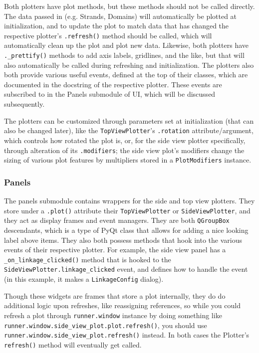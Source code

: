 \documentclass[titlepage]{article}
\begin{document}
	Both plotters have plot methods, but these methods should not be called directly. The data passed in (e.g. Strands, Domains) will automatically be plotted at initialization, and to update the plot to match data that has changed the respective plotter's \texttt{.refresh()} method should be called, which will automatically clean up the plot and plot new data. Likewise, both plotters have \texttt{.\_prettify()} methods to add axis labels, gridlines, and the like, but that will also automatically be called during refreshing and initialization. The plotters also both provide various useful events, defined at the top of their classes, which are documented in the docstring of the respective plotter. These events are subscribed to in the {Panels} submodule of UI, which will be discussed subsequently. 
	
	The plotters can be customized through parameters set at initialization (that can also be changed later), like the \texttt{TopViewPlotter}'s \texttt{.rotation} attribute/argument, which controls how rotated the plot is, or, for the side view plotter specifically, through alteration of its \texttt{.modifiers}; the side view plot's modifiers change the sizing of various plot features by multipliers stored in a \texttt{PlotModifiers} instance.
	
	\subsubsection{Panels}
	The panels submodule contains wrappers for the side and top view plotters. They store under a \texttt{.plot()} attribute their \texttt{TopViewPlotter} or \texttt{SideViewPlotter}, and they act as display frames and event managers. They are both \texttt{QGroupBox} descendants, which is a type of PyQt class that allows for adding a nice looking label above items. They also both possess methods that hook into the various events of their respective plotter. For example, the side view panel has a \texttt{\_on\_linkage\_clicked()} method that is hooked to the \texttt{SideViewPlotter.linkage\_clicked} event, and defines how to handle the event (in this example, it makes a \texttt{LinkageConfig} dialog).
	
	Though these widgets are frames that store a plot internally, they do do additional logic upon refreshes, like reassigning references, so while you could refresh a plot through \texttt{runner.window} instance by doing something like \texttt{runner.window.side\_view\_plot.plot.refresh()}, you should use \texttt{runner.window.side\_view\_plot.refresh()} instead. In both cases the Plotter's \texttt{refresh()} method will eventually get called.
	
\end{document}
